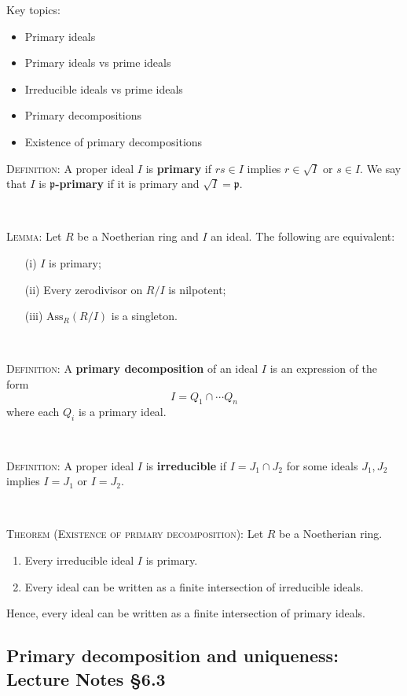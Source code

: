 \documentclass[12pt]{amsart}
\newcommand{\p}{\mathfrak{p}}
\newcommand{\Ass}{\mathrm{Ass}}
\newcommand{\0}{$\phantom{.}$}
\newcommand{\1}{\mathbbm{1}}
\begin{document}
  \begin{framed} Key topics:
\begin{itemize}
\item Primary ideals
\item Primary ideals vs prime ideals
\item Irreducible ideals vs prime ideals
\item Primary decompositions
\item Existence of primary decompositions
\end{itemize}
\end{framed}

\noindent \textsc{Definition:} A proper ideal $I$ is \textbf{primary} if $rs\in I$ implies $r\in \sqrt{I}$ or $s\in I$. We say that $I$ is \textbf{$\p$-primary} if it is primary and $\sqrt{I}=\p$.

\

\noindent \textsc{Lemma:} Let $R$ be a Noetherian ring and $I$ an ideal. The following are equivalent:
\begin{enumerate}
\item[(i)] $I$ is primary;
\item[(ii)] Every zerodivisor on $R/I$ is nilpotent;
\item[(iii)] $\Ass_R(R/I)$ is a singleton.
\end{enumerate}

\


\noindent \textsc{Definition:} A \textbf{primary decomposition} of an ideal $I$ is an expression of the form
\[ I = Q_1 \cap \cdots Q_n\]
where each $Q_i$ is a primary ideal.

\


\noindent \textsc{Definition:} A proper ideal $I$ is \textbf{irreducible} if $I=J_1\cap J_2$ for some ideals $J_1,J_2$ implies $I=J_1$ or $I=J_2$.


\


\noindent \textsc{Theorem (Existence of primary decomposition):} Let $R$ be a Noetherian ring.
\begin{enumerate}
\item Every irreducible ideal $I$ is primary.
\item Every ideal can be written as a finite intersection of irreducible ideals.
\end{enumerate}
Hence, every ideal can be written as a finite intersection of primary ideals.


\newpage

\subsection{Primary decomposition and uniqueness: Lecture Notes \S6.3}\0
 
\end{document}
